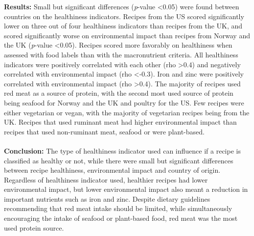 \textbf{Results:} Small but significant differences (\emph{p}-value <0.05) were found between countries on the healthiness indicators. Recipes from the US scored significantly lower on three out of four healthiness indicators than recipes from the UK, and scored significantly worse on environmental impact than recipes from Norway and the UK (\emph{p}-value <0.05). Recipes scored more favorably on healthiness when assessed with food labels than with the macronutrient criteria. All healthiness indicators were positively correlated with each other (rho >0.4) and negatively correlated with environmental impact (rho <-0.3). Iron and zinc were positively correlated with environmental impact (rho >0.4). The majority of recipes used red meat as a source of protein, with the second most used source of protein being seafood for Norway and the UK and poultry for the US. Few recipes were either vegetarian or vegan, with the majority of vegetarian recipes being from the UK. Recipes that used ruminant meat had higher environmental impact than recipes that used non-ruminant meat, seafood or were plant-based.\\\\
\textbf{Conclusion:} The type of healthiness indicator used can influence if a recipe is classified as healthy or not, while there were small but significant differences between recipe healthiness, environmental impact and country of origin. Regardless of healthiness indicator used, healthier recipes had lower environmental impact, but lower environmental impact also meant a reduction in important nutrients such as iron and zinc. Despite dietary guidelines recommending that red meat intake should be limited, while simultaneously encouraging the intake of seafood or plant-based food, red meat was the most used protein source.
\pagebreak
